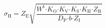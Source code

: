 
\begin{equation}
{\sigma }_{\mathrm{H}}\mathrm{=}Z_{\mathrm{E}}\sqrt{\frac{W^{\mathrm{t}}{\mathrm{\cdot }K}_{\mathrm{O}}{\mathrm{\cdot }K}_{\mathrm{V}}\mathrm{\cdot }K_{\mathrm{S}}\mathrm{\cdot }K_{\mathrm{H}}\mathrm{\cdot }Z_{\mathrm{R}}}{D_{\mathrm{P}}\mathrm{\cdot }b\mathrm{\cdot }Z_{\mathrm{I}}}} 
\end{equation}